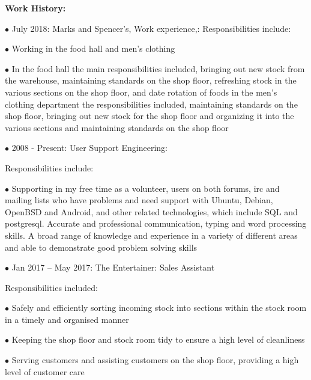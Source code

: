 \documentclass[10pt,a4paper]{book}
\begin{document}
\begin{flushleft}
\textbf {Work History:}

\item[$\bullet$] July 2018: Marks and Spencer's, Work experience,:
  \linebreak{}
Responsibilities include:

  \item[$\bullet$] Working in the food hall and men's clothing

  \item[$\bullet$] In the food hall the main responsibilities included, bringing out new stock from the warehouse, maintaining standards on the shop floor, refreshing stock in the various sections on the shop floor, and date rotation of foods in the men's clothing department the responsibilities included, maintaining standards on the shop floor, bringing out new stock for the shop floor and organizing it into the various sections and maintaining standards on the shop floor
\linebreak{}
  \item[$\bullet$] 2008 - Present: User Support Engineering: 

Responsibilities include:

  \item[$\bullet$]Supporting in my free time as a volunteer, users on both forums, irc and mailing lists who have problems and need support with Ubuntu, Debian, OpenBSD and Android, and other related technologies, which include SQL and postgresql. Accurate and professional communication, typing and word processing skills. A broad range of knowledge and experience in a variety of different areas and able to demonstrate good problem solving skills
\linebreak{}
\item[$\bullet$]Jan 2017 -- May 2017: The Entertainer: Sales Assistant
  
Responsibilities included:

  \item[$\bullet$]Safely and efficiently sorting incoming stock into sections within the stock room in a timely and organised manner

  \item[$\bullet$]Keeping the shop floor and stock room tidy to ensure a high level of cleanliness

  \item[$\bullet$]Serving customers and assisting customers on the shop floor, providing a high level of customer care


\end{flushleft}
\end{document}
